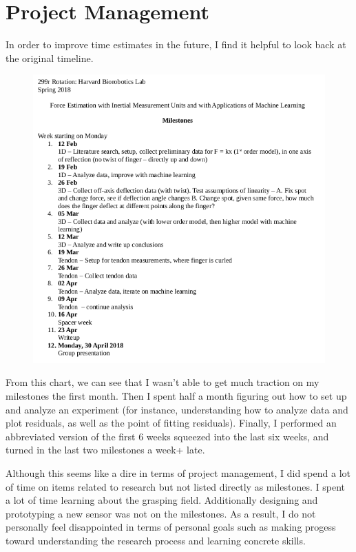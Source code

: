 \documentclass[preprint,12pt,3p]{elsarticle}
\begin{document}
\newpage

\section{Project Management}

In order to improve time estimates in the future, I find it helpful to look back
at the original timeline. 

\begin{figure}[H]
\centering
\includegraphics[width=.9\textwidth]{images/misc/timeline.png}
\end{figure}

From this chart, we can see that I wasn't able to get much traction on my
milestones the first month. Then I spent half a month figuring
out how to set up and analyze an experiment (for instance, understanding how to
analyze data and plot residuals, as well as the point of fitting residuals). Finally, I performed an
abbreviated version of the first 6 weeks squeezed into the last six weeks, and
turned in the last two milestones a week+ late.

Although this seems like a dire in terms of project management, I did  spend a
lot of time on items related to research but not listed directly as milestones. 
I spent a lot of time learning about the grasping field. Additionally designing and
prototyping a new sensor was not on the milestones. As a result, I do not
personally feel disappointed in terms of personal goals such as making progess
toward understanding the research process and learning concrete skills.
\end{document}
